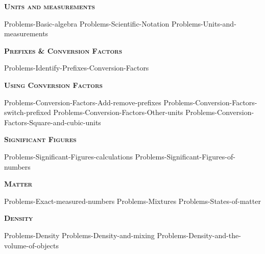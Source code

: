 \documentclass[main.tex]{subfiles}
\newcommand\chapterlabel{Ch-measurements}
\begin{document}
\newpage
\setdoublesep{0.35700 em}  %
\setatomsep{1.78500 em}    %
\setbondoffset{0.18265 em} %
\newcommand{\bondwidth}{0.06642 em} %
\setbondstyle{line width = \bondwidth}
\fancyhfoffset[E,O]{0pt}
\setlength{\columnsep}{30pt}
\begin{conclusion}
\end{conclusion}
\begin{multicols*}{2}\setcounter{numA}{1}



{\raggedright\textsc{\textbf{Units and measurements }}\par}
{Problems-Basic-algebra}
{Problems-Scientific-Notation}
{Problems-Units-and-measurements}


{\raggedright\textsc{\textbf{Prefixes \& Conversion Factors }}\par}
{Problems-Identify-Prefixes-Conversion-Factors}




{\raggedright\textsc{\textbf{Using Conversion Factors }}\par}
{Problems-Conversion-Factors-Add-remove-prefixes}
{Problems-Conversion-Factors-switch-prefixed}
{Problems-Conversion-Factors-Other-units}
{Problems-Conversion-Factors-Square-and-cubic-units}
{\raggedright\textsc{\textbf{Significant Figures }}\par}
{Problems-Significant-Figures-calculations}
{Problems-Significant-Figures-of-numbers}

{\raggedright\textsc{\textbf{Matter}}\par} %
{Problems-Exact-measured-numbers}%
{Problems-Mixtures}%
{Problems-States-of-matter}%


{\raggedright\textsc{\textbf{Density}}\par}
{Problems-Density}
{Problems-Density-and-mixing}
{Problems-Density-and-the-volume-of-objects}













\end{multicols*}
\end{document}
